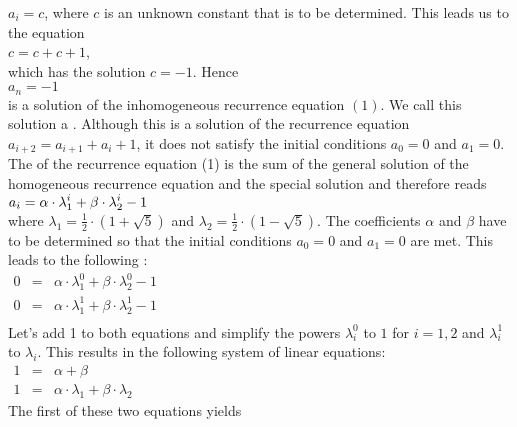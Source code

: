 $a_i = c$, where $c$ is an unknown constant that is to be determined.  This leads us to the equation \\[0.2cm] 
\hspace*{1.3cm}
$c = c + c + 1$,
\\[0.2cm]
which has the solution $c = -1$.  Hence
\\[0.2cm]
\hspace*{1.3cm}
$a_n = -1$ 
\\[0.2cm]
is a solution of the inhomogeneous recurrence equation $(1)$. We call this solution a .
  Although this is a solution of the recurrence equation $a_{i+2} = a_{i+1} + a_i + 1$,
it does not satisfy the initial conditions $a_0 = 0$ and $a_1 = 0$.
The   of the recurrence equation (1) 
is the sum of the general solution of the homogeneous recurrence equation and the special
solution and therefore reads 
\\[0.2cm]
\hspace*{1.3cm}
$\displaystyle a_i = \alpha \cdot \lambda_1^i + \beta \cdot \lambda_2^i - 1$
\\[0.2cm]
where $\lambda_1 = \frac{1}{2}\cdot (1 + \sqrt{5})$ and $\lambda_2 = \frac{1}{2}\cdot (1 - \sqrt{5})$.
The coefficients $\alpha$ and $\beta$ have to be determined so that the
initial conditions $a_0 = 0$ and $a_1 = 0$ are met.  This leads to the following
: 
\\[0.2cm]
\hspace*{1.3cm}
$\begin{array}{lcl}
    0 & = & \alpha \cdot \lambda_1^0 + \beta \cdot \lambda_2^0 - 1 \\[0.1cm]
    0 & = & \alpha \cdot \lambda_1^1 + \beta \cdot \lambda_2^1 - 1 \\
  \end{array}
  $
\\[0.2cm]
Let's add 1 to both equations and simplify the powers $\lambda_i^0$ to $1$ for $i=1,2$ and
$\lambda_i^1$ to $\lambda_i$.  This results in the following system of linear equations:
\\[0.2cm]
\hspace*{1.3cm}
$ \begin{array}{lcl}
    1 & = & \alpha + \beta \\[0.1cm]
    1 & = & \alpha \cdot \lambda_1 + \beta \cdot \lambda_2 
  \end{array}
$
\\[0.2cm]
The first of these two equations yields
